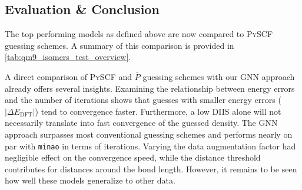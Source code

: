 \subsection{Evaluation \& Conclusion}
\label{subsec:qm9_isomers_eval_and_concl}
The top performing models as defined above are now compared to \textsc{PySCF} guessing schemes. A summary of this comparison is provided in \autoref{tab:qm9_isomers_test_overview}.
\begin{table}[H]
    \centering
    \caption[Models compared to \textsc{PySCF} and $\overline{P}$ schemes -  Isomers]{Comparison of different models with \textsc{PySCF} and $\overline{P}$ guessing schemes for QM9 -  Isomers.}
    \label{tab:qm9_isomers_test_overview}
\end{table}
A direct comparison of \textsc{PySCF} and $\overline{P}$ guessing schemes with our GNN approach already offers several insights. Examining the relationship between energy errors and the number of iterations shows that guesses with smaller energy errors ($|\Delta E_\text{DFT}|$) tend to convergence faster. 
Furthermore, a low DIIS alone will not necessarily translate into fast convergence of the guessed density. The GNN approach surpasses most conventional guessing schemes and performs nearly on par with \texttt{minao} in terms of iterations. Varying the data augmentation factor had negligible effect on the convergence speed, while the distance threshold contributes for distances around the bond length. However, it remains to be seen how well these models generalize to other data. 

